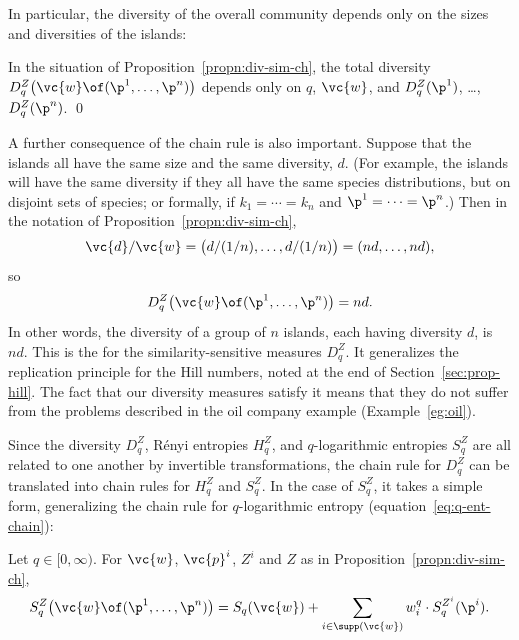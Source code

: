 In particular, the diversity of the overall community depends only on the
sizes and diversities of the islands:

\begin{cor}[Modularity]
%
% 
In the situation of Proposition~\ref{propn:div-sim-ch}, the total
diversity $D_q^Z\bigl(\vc{w} \of (\p^1, \ldots, \p^n)\bigr)$ depends only
on $q$, $\vc{w}$, and $D_q^Z(\p^1)$, \ldots, $D_q^Z(\p^n)$.  
\qed
\end{cor}

A further consequence of the chain rule is also important.  Suppose that
the islands all have the same size and the same diversity, $d$.  (For
example, the islands will have the same diversity if they all have
the same species distributions, but on disjoint sets of
species; or formally, if $k_1 = \cdots = k_n$ and $\p^1 = \cdots = \p^n$.)
Then in the notation of Proposition~\ref{propn:div-sim-ch},
\[
\vc{d}/\vc{w}
=
\bigl(d/(1/n), \ldots, d/(1/n)\bigr)
=
(nd, \ldots, nd),
\]
so
\[
D_q^Z\bigl(\vc{w} \of (\p^1, \ldots, \p^n)\bigr) = nd.
\]
In other words, the diversity of a group of $n$ islands, each having
diversity $d$, is $nd$.  This is the
 for the similarity-sensitive measures $D_q^Z$.  It generalizes
the replication principle for the Hill numbers, noted at the end of
Section~\ref{sec:prop-hill}.  The fact that our diversity measures satisfy
it means that they do not suffer from the problems described in the oil
company example (Example~\ref{eg:oil}).

Since the diversity $D_q^Z$, R\'enyi entropies $H_q^Z$, and $q$-logarithmic
entropies $S_q^Z$%
% 
%
% 
are all related to one another by invertible transformations, the chain
rule for $D_q^Z$ can be translated into chain rules for $H_q^Z$ and
$S_q^Z$.  In the case of $S_q^Z$, it takes a simple form, generalizing the
chain rule for $q$-logarithmic entropy (equation~\eqref{eq:q-ent-chain}):

\begin{propn}
%
%
% 
Let $q \in [0, \infty)$.  For $\vc{w}$, $\vc{p}^i$, $Z^i$ and $Z$ as in 
Proposition~\ref{propn:div-sim-ch}, 
\[
S_q^Z\bigl( \vc{w} \of (\p^1, \ldots, \p^n) \bigr)
=
S_q(\vc{w}) + \sum_{i \in \supp(\vc{w})} w_i^q \cdot S_q^{Z^i}(\p^i).
\]
\end{propn}

